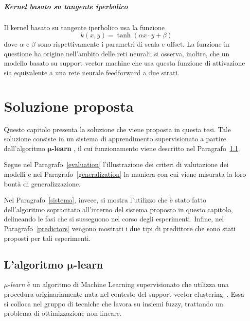 \documentclass[12pt]{report}
\theoremstyle{definition}
\begin{document}
\paragraph{Kernel basato su tangente iperbolico}
Il kernel basato su tangente iperbolico usa la funzione
\begin{equation}
    k(x,y) = \tanh(\alpha x \cdot y + \beta)
\end{equation}
dove $\alpha$ e $\beta$ sono rispettivamente i parametri di scala e offset. La funzione in questione ha origine nell'ambito delle reti neurali; si osserva, inoltre, che un modello basato su support vector machine che usa questa funzione di attivazione sia equivalente a una rete neurale feedforward a due strati.

\chapter{Soluzione proposta}
\label{Capitolo 2}
\onehalfspacing
Questo capitolo presenta la soluzione che viene proposta in questa tesi.
Tale soluzione consiste in un sistema di apprendimento supervisionato a partire dall'algoritmo $\bm{\mu}$\textbf{-learn} \cite{1}, il cui funzionamento viene descritto nel Paragrafo~\ref{mulearn}.

Segue nel Paragrafo~\ref{evaluation} l'illustrazione dei criteri di valutazione dei modelli e nel Paragrafo~\ref{generalization} la maniera con cui viene misurata la loro bontà di generalizzazione.

Nel Paragrafo~\ref{sistema}, invece, si mostra l'utilizzo che è stato fatto dell'algoritmo sopracitato all'interno del sistema proposto in questo capitolo, delineando le fasi che si susseguono nel corso degli esperimenti. Infine, nel Paragrafo~\ref{predictors} vengono mostrati i due tipi di predittore che sono stati proposti per tali esperimenti.

\section[\texorpdfstring{L'algoritmo $\mu$-learn}%
                        {mu-learn}]%
        {L'algoritmo $\bm{\mu}$-learn}  %
\label{mulearn}
$\mu$-\textit{learn} è un algoritmo di Machine Learning supervisionato che utilizza una procedura originariamente nata nel contesto del support vector clustering~\cite{23}.
Essa si colloca nel gruppo di tecniche che lavora su insiemi fuzzy, trattando un problema di ottimizzazione non lineare.
\end{document}
